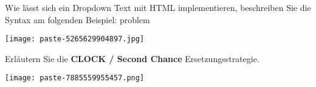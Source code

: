 \documentclass{article}
\begin{document}
\begin{tcolorbox}[colback=white!10!white,colframe=lightgray!75!black,
  savelowerto=\jobname_ex.tex]

\begin{center}
 Wie lässt sich ein Dropdown Text mit HTML implementieren, beschreiben Sie die Syntax am folgenden Beispiel:
problem
 

\end{center}

\tcblower

\justifying
\texttt{[image: paste-5265629904897.jpg]}

\end{tcolorbox}
\begin{tcolorbox}[colback=white!10!white,colframe=lightgray!75!black,
  savelowerto=\jobname_ex.tex]

\begin{center}
 Erläutern Sie die 
\textbf{CLOCK / Second Chance
}Ersetzungsstrategie. 

\end{center}

\tcblower

\justifying
\texttt{[image: paste-7885559955457.png]}

\end{tcolorbox}
\end{document}
